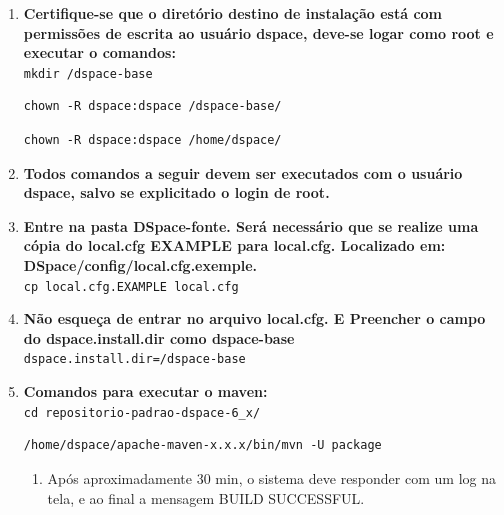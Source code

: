 \documentclass[12pt,hidelinks]{article}
\begin{document}
\begin{enumerate}
        \item \textbf{Certifique-se que o diretório destino de instalação está com permissões de escrita ao usuário dspace, deve-se logar como root e executar o comandos:}\\
        
            \texttt{mkdir /dspace-base}
            
             \begin{verbatim}
chown -R dspace:dspace /dspace-base/
            \end{verbatim}
            
            \begin{verbatim}
chown -R dspace:dspace /home/dspace/
            \end{verbatim}
            
        \item \textbf{Todos comandos a seguir devem ser executados com o usuário dspace, salvo se explicitado o login de root.}\\
        
        \item \textbf{Entre na pasta DSpace-fonte.  Será necessário que se realize uma cópia do local.cfg EXAMPLE para local.cfg. Localizado em: DSpace/config/local.cfg.exemple.}\\
        
            \texttt{cp local.cfg.EXAMPLE local.cfg}\\
            
        \item \textbf{Não esqueça de entrar no arquivo local.cfg. E Preencher o campo do dspace.install.dir como dspace-base}\\
            
            \texttt{dspace.install.dir=/dspace-base}\\
        
        \item \textbf{Comandos para executar o maven:}\\
        
            \texttt{cd repositorio-padrao-dspace-6\_x/}\\
            
             \begin{verbatim}
/home/dspace/apache-maven-x.x.x/bin/mvn -U package
            \end{verbatim}
            
            \begin{enumerate}
            \item Após aproximadamente 30 min, o sistema deve responder com um log na tela, e ao final a mensagem BUILD SUCCESSFUL.\\


\end{enumerate}
\end{enumerate}
\end{document}
